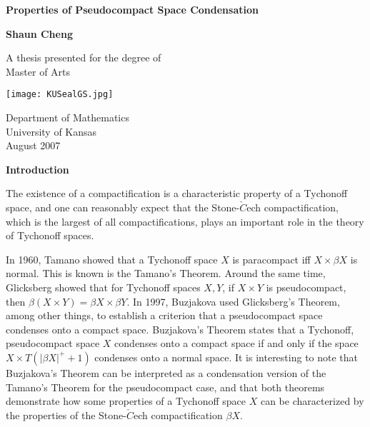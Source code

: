 \documentclass{article}
\begin{document}
\begin{titlepage}
\begin{center}
\vspace*{1cm}

\Huge
\textbf{Properties of Pseudocompact Space Condensation}


\vspace{0.5cm}

\vspace{1.5cm}

\textbf{Shaun Cheng}

\vfill

A thesis presented for the degree of\\
      Master of Arts

      \vspace{0.8cm}

      \texttt{[image: KUSealGS.jpg]}

      \Large
      Department of Mathematics\\
	  University of Kansas\\
	  August 2007

	  \end{center}
	  \end{titlepage}






	  \tableofcontents
	  \newpage
	  \begin{center}
	  \Large
	  \textbf{Introduction}
	  \end{center}
	  \vskip 30pt
	  The existence of a compactification is a characteristic property of a Tychonoff space, and one can reasonably expect that the Stone-$\check{C}$ech compactification, which is the largest of all compactifications, plays an important role in the theory of Tychonoff spaces. 

	  \vskip 15pt
	  In 1960, Tamano showed that a Tychonoff space $X$ is paracompact iff $X\times \beta X$ is normal. This is known is the Tamano's Theorem. Around the same time, Glicksberg showed that for Tychonoff spaces $X,Y$, if $X\times Y$ is pseudocompact, then $\beta (X\times Y)=\beta X\times \beta Y$. In 1997, Buzjakova used Glicksberg's Theorem, among other things, to establish a criterion that a pseudocompact space condenses onto a compact space. 
	  Buzjakova's Theorem states that a Tychonoff, pseudocompact space $X$ condenses onto a compact space if and only if the space $X\times T(|\beta X|^+ +1)$ condenses onto a normal space.
	  \vskip 15pt
	  It is interesting to note that Buzjakova's Theorem can be interpreted as a condensation version of the Tamano's Theorem for the pseudocompact case, and that both theorems demonstrate how some properties of a Tychonoff space $X$ can be characterized by the properties of the Stone-$\check{C}$ech compactification $\beta X$.
\end{document}
